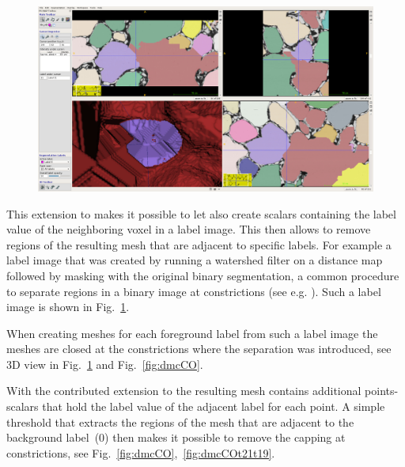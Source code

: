 \documentclass{InsightArticle}
\begin{document}
\begin{figure}[!b]
\center
\includegraphics[width=\textwidth]{images/vtkDiscreteMarchingCubes_extension_07}
\label{fig:labelimage}
\end{figure}


This extension to  makes it possible to let  also create  scalars containing the label value of the neighboring voxel in a label image. This then allows to remove regions of the resulting mesh that are adjacent to specific labels. For example a label image that was created by running a watershed filter on a distance map followed by masking with the original binary segmentation, a common procedure to separate regions in a binary image at constrictions (see e.g. \citet{Beare2006b}). Such a label image is shown in Fig.~\ref{fig:labelimage}.

When creating meshes for each foreground label from such a label image the meshes are closed at the constrictions where the separation was introduced, see 3D view in Fig.~\ref{fig:labelimage} and Fig.~\ref{fig:dmcCO}.

With the contributed extension to  the resulting mesh contains additional points-scalars that hold the label value of the adjacent label for each point. A simple threshold that extracts the regions of the mesh that are adjacent to the background label~(0) then makes it possible to remove the capping at constrictions, see Fig.~\ref{fig:dmcCO},~\ref{fig:dmcCOt21t19}.
\end{document}
